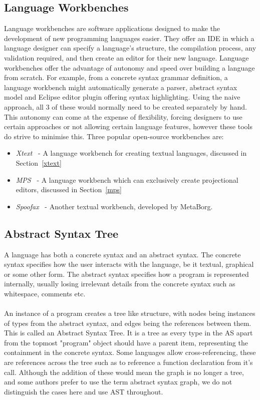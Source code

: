 \documentclass{article}
\begin{document}
\subsection{Language Workbenches}
Language workbenches are software applications designed to make the development of new programming languages easier. They offer an IDE in which a language designer can specify a language's structure, the compilation process, any validation required, and then create an editor for their new language. Language workbenches offer the advantage of autonomy and speed over building a language from scratch. For example, from a concrete syntax grammar definition, a language workbench might automatically generate a parser, abstract syntax model and Eclipse editor plugin offering syntax highlighting. Using the naive approach, all 3 of these would normally need to be created separately by hand. This autonomy can come at the expense of flexibility, forcing designers to use certain approaches or not allowing certain language features, however these tools do strive to minimise this. Three popular open-source workbenches are:
\begin{itemize}
\item \emph{Xtext}~\cite{xtext} - A language workbench for creating textual languages, discussed in Section~\ref{xtext}
\item \emph{MPS}~\cite{mps} - A language workbench which can exclusively create projectional editors, discussed in Section~\ref{mps}
\item \emph{Spoofax}~\cite{spoofax} - Another textual workbench, developed by MetaBorg. 
\end{itemize}
%
\subsection{Abstract Syntax Tree}
A language has both a concrete syntax and an abstract syntax. The concrete syntax specifies how the user interacts with the language, be it textual, graphical or some other form. The abstract syntax specifies how a program is represented internally, usually losing irrelevant details from the concrete syntax such as whitespace, comments etc.
\\
\\
An instance of a program creates a tree like structure, with nodes being instances of types from the abstract syntax, and edges being the references between them. This is called an Abstract Syntax Tree. It is a tree as every type in the AS apart from the topmost "program" object should have a parent item, representing the containment in the concrete syntax. Some languages allow cross-referencing, these are references across the tree such as to reference a function declaration from it's call. Although the addition of these would mean the graph is no longer a tree, and some authors prefer to use the term abstract syntax graph, we do not distinguish the cases here and use AST throughout.
\end{document}
